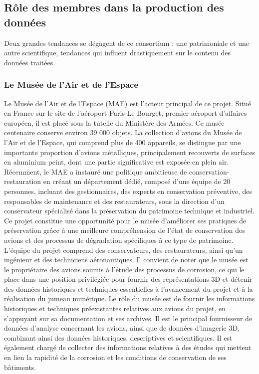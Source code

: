        \subsection{Rôle des membres dans la production des données}

Deux grandes tendances se dégagent de ce consortium : une patrimoniale et une autre scientifique, tendances qui influent drastiquement sur le contenu des données traitées.

            \subsubsection{Le Musée de l'Air et de l'Espace}

Le Musée de l’Air et de l’Espace (MAE) est l'acteur principal de ce projet. Situé en France sur le site de l’aéroport Paris-Le Bourget, premier aéroport d'affaires européen, il est placé sous la tutelle du Ministère des Armées. Ce musée centenaire conserve environ 39 000 objets. La collection d'avions du Musée de l'Air et de l'Espace, qui comprend plus de 400 appareils, se distingue par une importante proportion d'avions métalliques, principalement recouverts de surfaces en aluminium peint, dont une partie significative est exposée en plein air. Récemment, le MAE a instauré une politique ambitieuse de conservation-restauration en créant un département dédié, composé d'une équipe de 20 personnes, incluant des gestionnaires, des experts en conservation préventive, des responsables de maintenance et des restaurateurs, sous la direction d'un conservateur spécialisé dans la préservation du patrimoine technique et industriel. Ce projet constitue une opportunité pour le musée d'améliorer ses pratiques de préservation grâce à une meilleure compréhension de l'état de conservation des avions et des processus de dégradation spécifiques à ce type de patrimoine. L'équipe du projet comprend des conservateurs, des restaurateurs, ainsi qu'un ingénieur et des techniciens aéronautiques. Il convient de noter que le musée est le propriétaire des avions soumis à l’étude des processus de corrosion, ce qui le place dans une position privilégiée pour fournir des représentations 3D et détenir des données historiques et techniques essentielles à l'avancement du projet et à la réalisation du jumeau numérique. Le rôle du musée est de fournir les informations historiques et techniques préexistantes relatives aux avions du projet, en s'appuyant sur sa documentation et ses archives. Il est le principal fournisseur de données d’analyse concernant les avions, ainsi que de données d’imagerie 3D, combinant ainsi des données historiques, descriptives et scientifiques. Il est également chargé de collecter des informations relatives à des études qui mettent en lien la rapidité de la corrosion et les conditions de conservation de ses bâtiments. 

